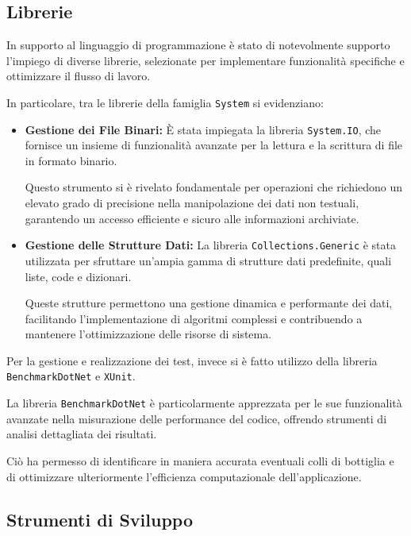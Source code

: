 \documentclass[12pt,a4paper,openright,twoside]{book}
\begin{document}
        \subsection{Librerie}
        \label{subsec:Librerie}

            In supporto al linguaggio di programmazione è stato di notevolmente supporto l’impiego di diverse librerie, selezionate per implementare funzionalità specifiche e ottimizzare il flusso di lavoro.

            In particolare, tra le librerie della famiglia \texttt{System} si evidenziano:

            \begin{itemize}
                \item \textbf{Gestione dei File Binari:} È stata impiegata la libreria \texttt{System.IO}, che fornisce un insieme di funzionalità avanzate per la lettura e la scrittura di file in formato binario.

                Questo strumento si è rivelato fondamentale per operazioni che richiedono un elevato grado di precisione nella manipolazione dei dati non testuali, garantendo un accesso efficiente e sicuro alle informazioni archiviate.

                \item \textbf{Gestione delle Strutture Dati:} La libreria \texttt{Collections.Generic} è stata utilizzata per sfruttare un’ampia gamma di strutture dati predefinite, quali liste, code e dizionari.

                Queste strutture permettono una gestione dinamica e performante dei dati, facilitando l’implementazione di algoritmi complessi e contribuendo a mantenere l’ottimizzazione delle risorse di sistema.
            \end{itemize}

            Per la gestione e realizzazione dei test, invece si è fatto utilizzo della libreria \texttt{BenchmarkDotNet} e \texttt{XUnit}.

            La libreria \texttt{BenchmarkDotNet} è particolarmente apprezzata per le sue funzionalità avanzate nella misurazione delle performance del codice, offrendo strumenti di analisi dettagliata dei risultati.

            Ciò ha permesso di identificare in maniera accurata eventuali colli di bottiglia e di ottimizzare ulteriormente l’efficienza computazionale dell’applicazione.

        \subsection{Strumenti di Sviluppo}
\end{document}
